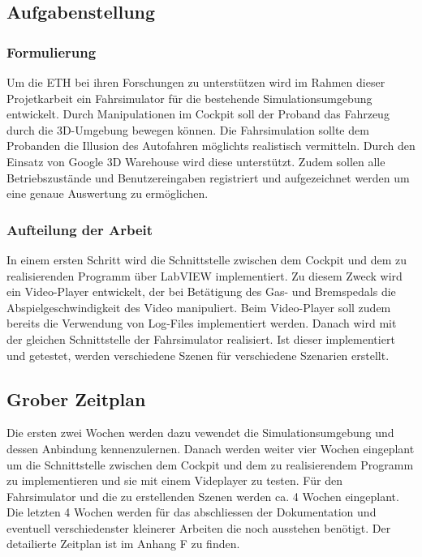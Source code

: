 \subsection{Aufgabenstellung}
\subsubsection{Formulierung}
Um die ETH bei ihren Forschungen zu unterstützen wird im Rahmen dieser Projetkarbeit ein Fahrsimulator für die bestehende Simulationsumgebung entwickelt. Durch Manipulationen im Cockpit soll der Proband das Fahrzeug durch die 3D-Umgebung bewegen können. Die Fahrsimulation sollte dem Probanden die Illusion des Autofahren möglichts realistisch vermitteln. Durch den Einsatz von Google 3D Warehouse wird diese unterstützt. Zudem sollen alle Betriebszustände und Benutzereingaben registriert und aufgezeichnet werden um eine genaue Auswertung zu ermöglichen. 

\subsubsection{Aufteilung der Arbeit}
In einem ersten Schritt wird die Schnittstelle zwischen dem Cockpit und dem zu realisierenden Programm über LabVIEW implementiert. Zu diesem Zweck wird ein Video-Player entwickelt, der bei Betätigung des Gas- und Bremspedals die Abspielgeschwindigkeit des Video manipuliert. Beim Video-Player soll zudem bereits die Verwendung von Log-Files  implementiert werden. Danach wird mit der gleichen Schnittstelle der Fahrsimulator realisiert. Ist dieser implementiert und getestet, werden verschiedene Szenen für verschiedene Szenarien erstellt. 

\subsection{Grober Zeitplan}
Die ersten zwei Wochen werden dazu vewendet die Simulationsumgebung und dessen Anbindung kennenzulernen. Danach werden weiter vier Wochen eingeplant um die Schnittstelle zwischen dem Cockpit und dem zu realisierendem Programm zu implementieren und sie mit einem Videplayer zu testen. Für den Fahrsimulator und die zu erstellenden Szenen werden ca. 4 Wochen eingeplant. Die letzten 4 Wochen werden für das abschliessen der Dokumentation und eventuell verschiedenster kleinerer Arbeiten die noch ausstehen benötigt. Der detailierte Zeitplan ist im Anhang F zu finden. 